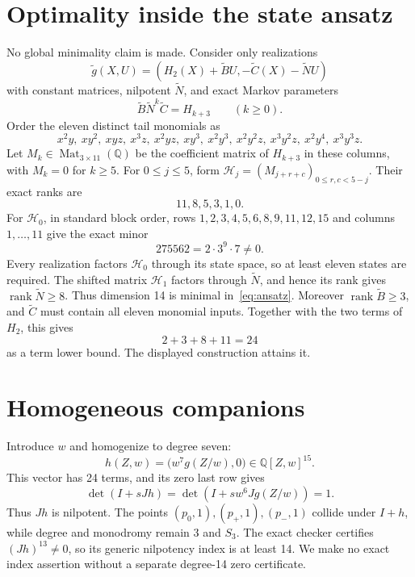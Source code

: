 \documentclass[11pt]{article}
\newcommand{\Q}{\mathbb Q}
\begin{document}
\section{Optimality inside the state ansatz}

No global minimality claim is made.  Consider only realizations
\begin{equation}
 \widetilde g(X,U)=(H_2(X)+\widetilde BU,
 -\widetilde C(X)-\widetilde NU) \label{eq:ansatz}
\end{equation}
with constant matrices, nilpotent $\widetilde N$, and exact Markov parameters
\[
 \widetilde B\widetilde N^k\widetilde C=H_{k+3}\qquad(k\geq0).
\]
Order the eleven distinct tail monomials as
\[
x^2y,\ xy^2,\ xyz,\ x^3z,\ x^2yz,\ xy^3,\ x^2y^3,\ x^2y^2z,\
x^3y^2z,\ x^2y^4,\ x^3y^3z.
\]
Let $M_k\in\operatorname{Mat}_{3\times11}(\Q)$ be the coefficient matrix
of $H_{k+3}$ in these columns, with $M_k=0$ for $k\geq5$.  For
$0\leq j\leq5$, form
$\mathcal H_j=(M_{j+r+c})_{0\leq r,c<5-j}$.  Their exact ranks are
\[
 11,8,5,3,1,0.
\]
For $\mathcal H_0$, in standard block order, rows
$1,2,3,4,5,6,8,9,11,12,15$ and columns $1,\ldots,11$ give the exact minor
\[
 275562=2\cdot3^9\cdot7\ne0.
\]
Every realization factors $\mathcal H_0$ through its state space, so at
least eleven states are required.  The shifted matrix $\mathcal H_1$ factors
through $\widetilde N$, and hence its rank gives
$\operatorname{rank}\widetilde N\geq8$.  Thus dimension 14 is minimal
in~\eqref{eq:ansatz}.  Moreover
$\operatorname{rank}\widetilde B\geq3$,
and $\widetilde C$ must contain all eleven monomial inputs.  Together with
the two terms of $H_2$, this gives
\[
 2+3+8+11=24
\]
as a term lower bound.  The displayed construction attains it.

\section{Homogeneous companions}

Introduce $w$ and homogenize to degree seven:
\begin{equation}
 h(Z,w)=\bigl(w^7g(Z/w),0\bigr)\in\Q[Z,w]^{15}. \label{eq:h}
\end{equation}
This vector has 24 terms, and its zero last row gives
\[
 \det(I+sJh)=\det(I+sw^6Jg(Z/w))=1.
\]
Thus $Jh$ is nilpotent.  The points $(p_0,1),(p_+,1),(p_-,1)$ collide
under $I+h$, while degree and monodromy remain $3$ and $S_3$.  The exact
checker certifies $(Jh)^{13}\ne0$, so its generic nilpotency index is at
least 14.  We make no exact index assertion without a separate degree-14
zero certificate.
\end{document}
